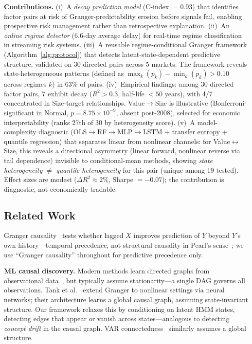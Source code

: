 \documentclass[sigconf,anonymous]{acmart}
\begin{document}
\textbf{Contributions.}
(i)~A \emph{decay prediction model} (C-index $= 0.93$) that identifies
factor pairs at risk of Granger-predictability erosion before signals fail,
enabling prospective risk management rather than retrospective explanation.
(ii)~An \emph{online regime detector} (6.6-day average delay) for real-time
regime classification in streaming risk systems.
(iii)~A reusable regime-conditional Granger framework
(Algorithm~\ref{alg:protocol}) that detects latent-state-dependent
predictive structure, validated on 30 directed pairs across 5 markets.
The framework reveals state-heterogeneous patterns (defined as $\max_k(p_k) - \min_k(p_k) > 0.10$ across regimes $k$) in 63\% of pairs.
(iv)~Empirical findings: among 30 directed factor pairs,
7 exhibit decay ($R^2 > 0.3$, half-life $< 50$ years), with 4/7
concentrated in Size-target relationships. Value$\to$Size is illustrative
(Bonferroni-significant in Normal, $p = 8.75 \times 10^{-9}$,
absent post-2008), selected for economic interpretability (ranks 27th of 30 by heterogeneity score).
(v)~A model-complexity diagnostic (OLS$\to$RF$\to$MLP$\to$LSTM + transfer
entropy + quantile regression) that separates linear from nonlinear channels:
for Value$\leftrightarrow$Size, this reveals a directional asymmetry
(linear forward, nonlinear reverse via tail dependence) invisible to
conditional-mean methods, showing \emph{state heterogeneity}
$\neq$ \emph{quantile heterogeneity} for this pair (unique among 19 tested).
Effect sizes are modest ($\Delta R^2 \approx 2\%$, Sharpe $= -0.07$);
the contribution is diagnostic, not economically tradable.

\subsection{Related Work}

Granger causality~\cite{granger1969investigating} tests whether
lagged $X$ improves prediction of $Y$ beyond $Y$'s own history---temporal
precedence, not structural causality in Pearl's
sense~\cite{pearl2009causality}; we use ``Granger causality''
throughout for predictive precedence only.

\textbf{ML causal discovery.}
Modern methods learn directed graphs from observational
data~\cite{pearl2009causality,spirtes2001causation}, but typically
assume stationarity---a single DAG governs all observations.
Tank et al.~\cite{tank2022neural} extend Granger to nonlinear settings
via neural networks; their architecture learns a global causal graph,
assuming state-invariant structure. Our framework relaxes this by
conditioning on latent HMM states, detecting edges that appear or
vanish across states---analogous to detecting \emph{concept drift} in
the causal graph. VAR connectedness~\cite{diebold2012better} similarly
assumes a global structure.
\end{document}
